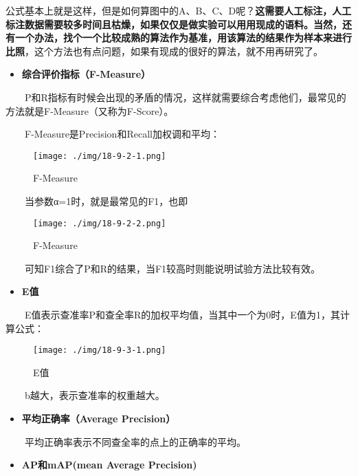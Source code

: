 公式基本上就是这样，但是如何算图中的A、B、C、D呢？\textbf{这需要人工标注，人工标注数据需要较多时间且枯燥，如果仅仅是做实验可以用用现成的语料。当然，还有一个办法，找个一个比较成熟的算法作为基准，用该算法的结果作为样本来进行比照}，这个方法也有点问题，如果有现成的很好的算法，就不用再研究了。

\begin{itemize}
\item
  \textbf{综合评价指标（F-Measure）}
\end{itemize}

  P和R指标有时候会出现的矛盾的情况，这样就需要综合考虑他们，最常见的方法就是F-Measure（又称为F-Score）。

  F-Measure是Precision和Recall加权调和平均：

\begin{figure}
\centering
\texttt{[image: ./img/18-9-2-1.png]}
\caption{F-Measure}
\end{figure}

  当参数α=1时，就是最常见的F1，也即

\begin{figure}
\centering
\texttt{[image: ./img/18-9-2-2.png]}
\caption{F-Measure}
\end{figure}

  可知F1综合了P和R的结果，当F1较高时则能说明试验方法比较有效。

\begin{itemize}
\item
  \textbf{E值}
\end{itemize}

  E值表示查准率P和查全率R的加权平均值，当其中一个为0时，E值为1，其计算公式：

\begin{figure}
\centering
\texttt{[image: ./img/18-9-3-1.png]}
\caption{E值}
\end{figure}

  b越大，表示查准率的权重越大。

\begin{itemize}
\item
  \textbf{平均正确率（Average Precision）}
\end{itemize}

  平均正确率表示不同查全率的点上的正确率的平均。

\begin{itemize}
\item
  \textbf{AP和mAP(mean Average Precision)}
\end{itemize}


